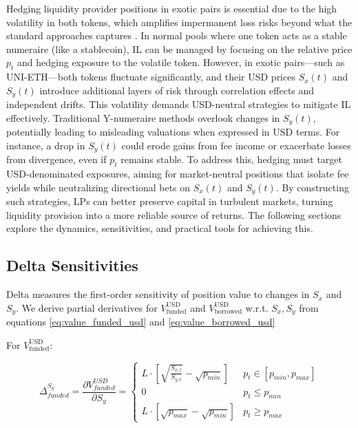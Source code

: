 \documentclass{article}
\begin{document}
Hedging liquidity provider positions in exotic pairs is essential due to the high volatility in both tokens, which amplifies impermanent loss risks beyond what the standard approaches captures \cite{khakhar2022}. In normal pools where one token acts as a stable numeraire (like a stablecoin), IL can be managed by focusing on the relative price $p_t$ and hedging exposure to the volatile token. However, in exotic pairs—such as UNI-ETH—both tokens fluctuate significantly, and their USD prices $S_x(t)$ and $S_y(t)$ introduce additional layers of risk through correlation effects and independent drifts.
This volatility demands USD-neutral strategies to mitigate IL effectively. Traditional Y-numeraire methods overlook changes in $S_y(t)$, potentially leading to misleading valuations when expressed in USD terms. For instance, a drop in $S_y(t)$ could erode gains from fee income or exacerbate losses from divergence, even if $p_t$ remains stable. To address this, hedging must target USD-denominated exposures, aiming for market-neutral positions that isolate fee yields while neutralizing directional bets on $S_x(t)$ and $S_y(t)$.
By constructing such strategies, LPs can better preserve capital in turbulent markets, turning liquidity provision into a more reliable source of returns. The following sections explore the dynamics, sensitivities, and practical tools for achieving this.

\subsection{Delta Sensitivities}
Delta measures the first-order sensitivity of position value to changes in $S_x$ and $S_y$. We derive partial derivatives for $V_{\text{funded}}^{\text{USD}}$ and $V_{\text{borrowed}}^{\text{USD}}$ w.r.t. $S_x,S_y$ from equations \eqref{eq:value_funded_usd} and \eqref{eq:value_borrowed_usd}

For $V_{\text{funded}}^{\text{USD}}$:

\begin{equation}
    \Delta_{funded}^{S_y} = \frac{\partial V_{funded}^{USD}}{\partial S_y}=
    \begin{cases}
        L\cdot \left[ \sqrt{\frac{S_{x,t}}{S_{y,t}}}-\sqrt{p_{min}}\right] & p_t \in [p_{min}, p_{max}] \\
        0 & p_t \leq p_{min} \\
        L\cdot \left[ \sqrt{p_{max}}-\sqrt{p_{min}}\right] & p_t \geq p_{max}
    \end{cases}
\end{equation}
\end{document}

